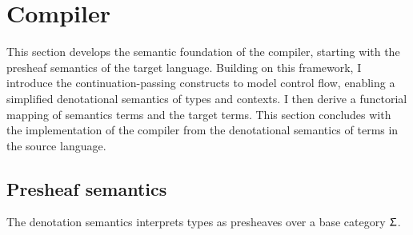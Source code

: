 \documentclass[12pt,a4paper]{report}
\theoremstyle{definition}
\newcommand{\mb}[1]{\textcolor{mediumblue}{#1}}
\newcommand{\bN}{\ensuremath{\mathbb{N}}}
\begin{document}



    

    \section{Compiler} \label{sec: compiler}
    This section develops the semantic foundation of the compiler, starting with the presheaf semantics of the target language. Building on this framework, I introduce the continuation-passing constructs to model control flow, enabling a simplified denotational semantics of types and contexts. I then derive a functorial mapping of semantics terms and the target terms. This section concludes with the implementation of the compiler from the denotational semantics of terms in the source language.
    \subsection{Presheaf semantics}
    The denotation semantics interprets types as presheaves over a base category $\Upsigma$. 
\end{document}
